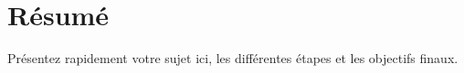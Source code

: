\section{Résumé}
Présentez rapidement votre sujet ici, les différentes étapes et les objectifs finaux.